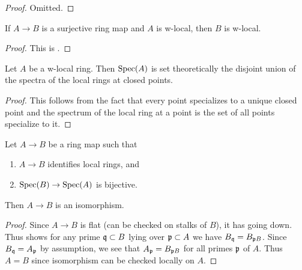 \begin{proof}
  Omitted.
\end{proof}

\begin{lemma}
  \label{thm:surjective-w-local-ring}
  If \(A \to B\) is a surjective ring map and \(A\) is w-local, then \(B\) is w-local.
  \leanok
\end{lemma}

\begin{proof}
  \leanok
  This is .
\end{proof}

\begin{lemma}
  \label{thm:w-local-set-decomposition}
  Let $A$ be a w-local ring. Then $\operatorname{Spec} (A)$ is set theoretically the disjoint union of the spectra of the local
  rings at closed points.
\end{lemma}

\begin{proof}
  This follows from the fact that every point specializes to a unique closed point and the spectrum of the local ring at a point is the set of all points specialize to it.
\end{proof}

\begin{lemma}
  \label{thm:isom-of-identifies-local-rings-bijective}
  \leanok
  Let $A \to B$ be a ring map such that
  \begin{enumerate}
    \item $A \to B$ identifies local rings, and
    \item $\operatorname{Spec} (B) \to \operatorname{Spec} (A)$ is bijective.
  \end{enumerate}
  Then $A \to B$ is an isomorphism.
\end{lemma}

\begin{proof}
    \leanok
    Since $A \to B$ is flat (can be checked on stalks of \(B\)), it has going down. %
    Thus  shows for any prime ${\mathfrak{q}} \subset B$ lying over ${\mathfrak{p}} \subset A$ we have $B_{{\mathfrak{q}}} = B_{{\mathfrak{p}} B}$. Since $B_{{\mathfrak{q}}} = A_{{\mathfrak{p}}}$ by assumption, we see that $A_{{\mathfrak{p}}} = B_{{\mathfrak{p}} B}$ for all primes ${\mathfrak{p}}$ of $A$. Thus $A = B$ since isomorphism can be checked locally on $A$.
\end{proof}


